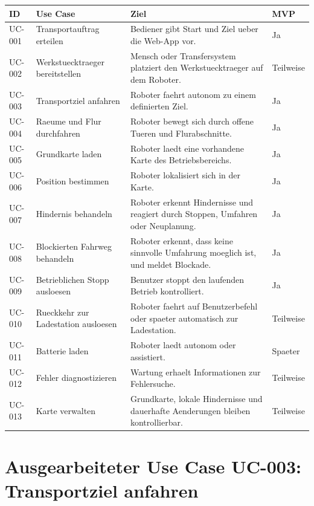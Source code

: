 \begin{longtable}{L{0.15\textwidth} L{0.32\textwidth} L{0.34\textwidth} L{0.10\textwidth}}
\toprule
ID & Use Case & Ziel & MVP \\
\midrule
UC-001 & Transportauftrag erteilen & Bediener gibt Start und Ziel ueber die Web-App vor. & Ja \\
UC-002 & Werkstuecktraeger bereitstellen & Mensch oder Transfersystem platziert den Werkstuecktraeger auf dem Roboter. & Teilweise \\
UC-003 & Transportziel anfahren & Roboter faehrt autonom zu einem definierten Ziel. & Ja \\
UC-004 & Raeume und Flur durchfahren & Roboter bewegt sich durch offene Tueren und Flurabschnitte. & Ja \\
UC-005 & Grundkarte laden & Roboter laedt eine vorhandene Karte des Betriebsbereichs. & Ja \\
UC-006 & Position bestimmen & Roboter lokalisiert sich in der Karte. & Ja \\
UC-007 & Hindernis behandeln & Roboter erkennt Hindernisse und reagiert durch Stoppen, Umfahren oder Neuplanung. & Ja \\
UC-008 & Blockierten Fahrweg behandeln & Roboter erkennt, dass keine sinnvolle Umfahrung moeglich ist, und meldet Blockade. & Ja \\
UC-009 & Betrieblichen Stopp ausloesen & Benutzer stoppt den laufenden Betrieb kontrolliert. & Ja \\
UC-010 & Rueckkehr zur Ladestation ausloesen & Roboter faehrt auf Benutzerbefehl oder spaeter automatisch zur Ladestation. & Teilweise \\
UC-011 & Batterie laden & Roboter laedt autonom oder assistiert. & Spaeter \\
UC-012 & Fehler diagnostizieren & Wartung erhaelt Informationen zur Fehlersuche. & Teilweise \\
UC-013 & Karte verwalten & Grundkarte, lokale Hindernisse und dauerhafte Aenderungen bleiben kontrollierbar. & Teilweise \\
\bottomrule
\end{longtable}

\section{Ausgearbeiteter Use Case UC-003: Transportziel anfahren}

